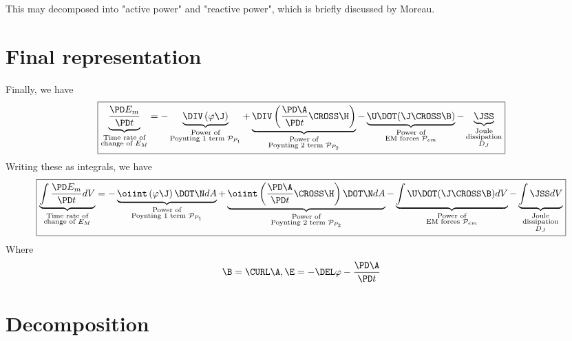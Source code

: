 \documentclass[11pt]{article}
\begin{document}
This may decomposed into "active power" and "reactive power", which is briefly discussed by Moreau.

\section{Final representation}
Finally, we have
\begin{equation}
	\boxed{
	\underbrace{\frac{\PD E_m}{\PD t} }_
	{\substack{\text{Time rate of}\\\text{change of $E_M$}}}
	=
	- \underbrace{\DIV \left(\varphi \J \right) }_
	{\substack{\text{Power of}\\\text{Poynting 1 term $\mathcal P_{P_1}$}}}
	+ \underbrace{\DIV \left( \frac{\PD \A}{\PD t} \CROSS \H \right)}_
	{\substack{\text{Power of}\\\text{Poynting 2 term $\mathcal P_{P_2}$}}}
	- \underbrace{\U \DOT (\J \CROSS \B)}_
	{\substack{\text{Power of}\\\text{EM forces $\mathcal P_{em}$}}}
	- \underbrace{\JSS}_
	{\substack{\text{Joule}\\\text{dissipation}\\\text{$D_J$}}}
	}
\end{equation}
Writing these as integrals, we have
\begin{equation}
	\boxed{
	\underbrace{\int \frac{\PD E_m}{\PD t} dV}_
	{\substack{\text{Time rate of}\\\text{change of $E_M$}}}
	=
	- \underbrace{\oiint \left(\varphi \J \right) \DOT \N dA }_
	{\substack{\text{Power of}\\\text{Poynting 1 term $\mathcal P_{P_1}$}}}
	+ \underbrace{\oiint \left( \frac{\PD \A}{\PD t} \CROSS \H \right)\DOT \N dA }_
	{\substack{\text{Power of}\\\text{Poynting 2 term $\mathcal P_{P_2}$}}}
	- \underbrace{\int \U \DOT (\J \CROSS \B) dV}_
	{\substack{\text{Power of}\\\text{EM forces $\mathcal P_{em}$}}}
	- \underbrace{\int \JSS dV}_
	{\substack{\text{Joule}\\\text{dissipation}\\\text{$D_J$}}}
	}
\end{equation}
Where
\begin{equation}
	\B = \CURL \A, \E = - \DEL \varphi - \frac{\PD \A}{\PD t}
\end{equation}
\section{Decomposition}
\end{document}
